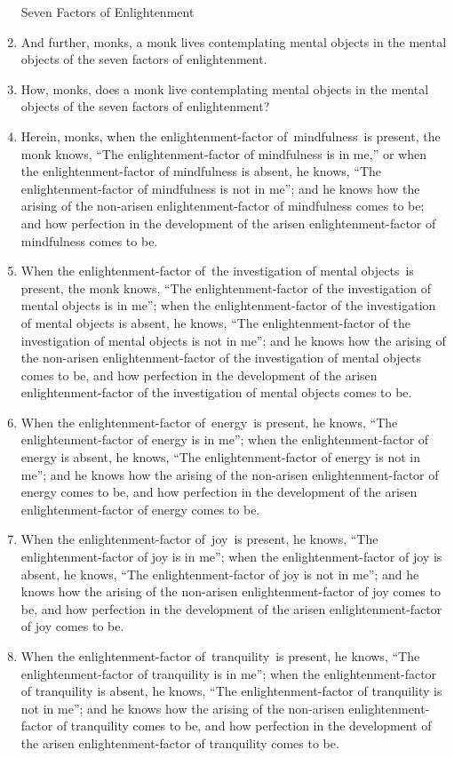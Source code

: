 \documentclass[a4 paper, 12pt]{article}
\begin{document}
\begin{multicols}{2}
\begin{enumerate}[resume]
Seven Factors of Enlightenment
\item And further, monks, a monk lives contemplating mental objects in the mental objects of the seven factors of enlightenment.
\item How, monks, does a monk live contemplating mental objects in the mental objects of the seven factors of enlightenment?
\item Herein, monks, when the enlightenment-factor of mindfulness is present, the monk knows, “The enlightenment-factor of mindfulness is in me,” or when the enlightenment-factor of mindfulness is absent, he knows, “The enlightenment-factor of mindfulness is not in me”; and he knows how the arising of the non-arisen enlightenment-factor of mindfulness comes to be; and how perfection in the development of the arisen enlightenment-factor of mindfulness comes to be.
\item When the enlightenment-factor of the investigation of mental objects is present, the monk knows, “The enlightenment-factor of the investigation of mental objects is in me”; when the enlightenment-factor of the investigation of mental objects is absent, he knows, “The enlightenment-factor of the investigation of mental objects is not in me”; and he knows how the arising of the non-arisen enlightenment-factor of the investigation of mental objects comes to be, and how perfection in the development of the arisen enlightenment-factor of the investigation of mental objects comes to be.
\item When the enlightenment-factor of energy is present, he knows, “The enlightenment-factor of energy is in me”; when the enlightenment-factor of energy is absent, he knows, “The enlightenment-factor of energy is not in me”; and he knows how the arising of the non-arisen enlightenment-factor of energy comes to be, and how perfection in the development of the arisen enlightenment-factor of energy comes to be.
\item When the enlightenment-factor of joy is present, he knows, “The enlightenment-factor of joy is in me”; when the enlightenment-factor of joy is absent, he knows, “The enlightenment-factor of joy is not in me”; and he knows how the arising of the non-arisen enlightenment-factor of joy comes to be, and how perfection in the development of the arisen enlightenment-factor of joy comes to be.
\item When the enlightenment-factor of tranquility is present, he knows, “The enlightenment-factor of tranquility is in me”; when the enlightenment-factor of tranquility is absent, he knows, “The enlightenment-factor of tranquility is not in me”; and he knows how the arising of the non-arisen enlightenment-factor of tranquility comes to be, and how perfection in the development of the arisen enlightenment-factor of tranquility comes to be.

\end{enumerate}
\end{multicols}
\end{document}
